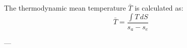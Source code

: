 The thermodynamic mean temperature \( \bar{T} \) is calculated as:  
\[
\bar{T} = \frac{\int T \, dS}{s_a - s_e}
\]  

---